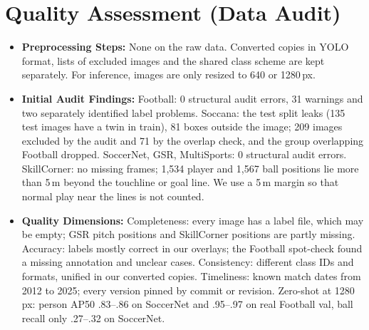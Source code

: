 \documentclass[11pt, a4paper]{article}
\begin{document}
\section{Quality Assessment (Data Audit)}
\begin{itemize}
    \item \textbf{Preprocessing Steps:} None on the raw data. Converted copies in YOLO format, lists of excluded images and the shared class scheme are kept separately. For inference, images are only resized to 640 or 1280\,px.
    \item \textbf{Initial Audit Findings:} Football: 0 structural audit errors, 31 warnings and two separately identified label problems. Soccana: the test split leaks (135 test images have a twin in train), 81 boxes outside the image; 209 images excluded by the audit and 71 by the overlap check, and the group overlapping Football dropped. SoccerNet, GSR, MultiSports: 0 structural audit errors. SkillCorner: no missing frames; 1,534 player and 1,567 ball positions lie more than 5\,m beyond the touchline or goal line. We use a 5\,m margin so that normal play near the lines is not counted.
    \item \textbf{Quality Dimensions:} Completeness: every image has a label file, which may be empty; GSR pitch positions and SkillCorner positions are partly missing. Accuracy: labels mostly correct in our overlays; the Football spot-check found a missing annotation and unclear cases. Consistency: different class IDs and formats, unified in our converted copies. Timeliness: known match dates from 2012 to 2025; every version pinned by commit or revision. Zero-shot at 1280\,px: person AP50 .83--.86 on SoccerNet and .95--.97 on real Football val, ball recall only .27--.32 on SoccerNet.
\end{itemize}

\end{document}
